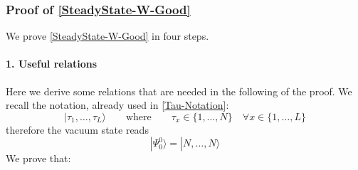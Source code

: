 \documentclass[10pt]{article}
\numberwithin{equation}{section}
\numberwithin{equation}{subsection}
\begin{document}
\subsubsection{Proof of \eqref{SteadyState-W-Good}}
We prove \eqref{SteadyState-W-Good} in four steps. 
\paragraph{1. Useful relations} Here we derive some relations that are needed in the following of the proof. 
We recall the notation, already used in \eqref{Tau-Notation}:
\begin{equation}
	|\tau_{1},\ldots,\tau_{L}\rangle\qquad \text{where}\qquad \tau_{x}\in\{1,\ldots,N\}\quad \forall x\in \{1,\ldots,L\}
\end{equation}
therefore the vacuum state reads
\begin{equation}
	|\Psi_{0}^{0}\rangle=|N,\ldots,N\rangle
\end{equation}
We prove that:
\end{document}
